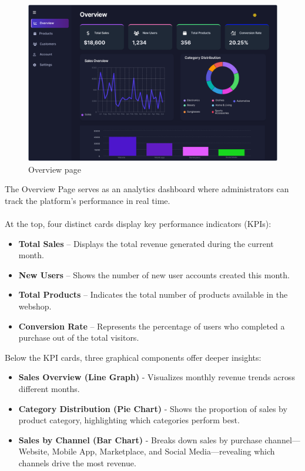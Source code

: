 \documentclass[11pt,a4paper]{article}
\begin{document}
	\begin{figure}[h]
    \centering
    \includegraphics[width=1\textwidth]{pictures/admin/Overview_Admin}
    \caption{Overview page}\label{fig:figure1}
\end{figure}
\vspace{0.3cm}
The Overview Page serves as an analytics dashboard where administrators can track the platform’s performance in real time. \\ \\
At the top, four distinct cards display key performance indicators (KPIs):
\begin{itemize}
\item \textbf{Total Sales} – Displays the total revenue generated during the current month.
\item \textbf{New Users} – Shows the number of new user accounts created this month.
\item \textbf{Total Products} – Indicates the total number of products available in the webshop.
\item \textbf{Conversion Rate} – Represents the percentage of users who completed a purchase out of the total visitors.
\end{itemize}
Below the KPI cards, three graphical components offer deeper insights:
\begin{itemize}
\item \textbf{Sales Overview (Line Graph)} - Visualizes monthly revenue trends across different months.
\item \textbf{Category Distribution (Pie Chart)} - Shows the proportion of sales by product category, highlighting which categories perform best.
\item \textbf{Sales by Channel (Bar Chart)} - Breaks down sales by purchase channel—Website, Mobile App, Marketplace, and Social Media—revealing which channels drive the most revenue.
\end{itemize}
\end{document}
